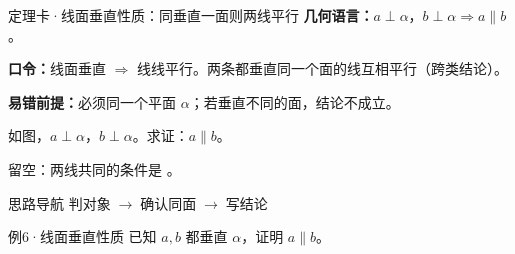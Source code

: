 \documentclass{exam-zh}
\begin{document}
\begin{eduDualExplain}
  \begin{eduExplainLeft}
  \end{eduExplainLeft}

  \begin{eduExplainRight}
  \end{eduExplainRight}
\end{eduDualExplain}





\begin{eduSolutionBox}{定理卡·线面垂直性质：同垂直一面则两线平行}
  \begingroup
  \setlength{\parskip}{2.5mm}
\textbf{几何语言：}$a\perp\alpha$，$b\perp\alpha\Rightarrow a\parallel b$。\par
\textbf{口令：}线面垂直 $\Rightarrow$ 线线平行。两条都垂直同一个面的线互相平行（跨类结论）。\par
\textbf{易错前提：}必须同一个平面 $\alpha$；若垂直不同的面，结论不成立。\par
  \endgroup
\end{eduSolutionBox}




\begin{eduProblemBlock}[例6·线面垂直性质]
如图，$a\perp\alpha$，$b\perp\alpha$。求证：$a\parallel b$。
\par\noindent 留空：两线共同的条件是 \underline{\hspace{20mm}}。

\end{eduProblemBlock}





\begin{eduAuxItem}{思路导航}
判对象$\;\to\;$确认同面$\;\to\;$写结论\end{eduAuxItem}




\begin{eduSubQuestionItem}{例6·线面垂直性质}
已知 $a,b$ 都垂直 $\alpha$，证明 $a\parallel b$。\end{eduSubQuestionItem}
\end{document}
